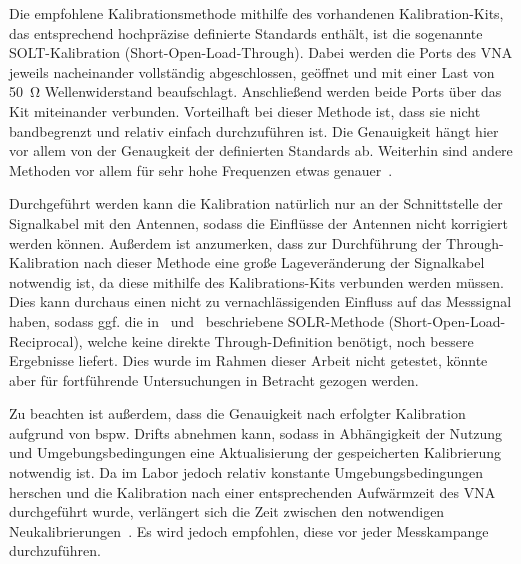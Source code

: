 Die empfohlene Kalibrationsmethode mithilfe des vorhandenen Kalibration-Kits, das entsprechend hochpräzise definierte Standards enthält, ist die sogenannte SOLT-Kalibration (Short-Open-Load-Through). Dabei werden die Ports des VNA jeweils nacheinander vollständig abgeschlossen, geöffnet und mit einer Last von \SI{50}{\ohm} Wellenwiderstand beaufschlagt. Anschließend werden beide Ports über das Kit miteinander verbunden. Vorteilhaft bei dieser Methode ist, dass sie nicht bandbegrenzt und relativ einfach durchzuführen ist. Die Genauigkeit hängt hier vor allem von der Genaugkeit der definierten Standards ab. Weiterhin sind andere Methoden vor allem für sehr hohe Frequenzen etwas genauer~\cite{VNA-Calibration_Application_Note}. 
\par
\vspace{\linespace}
Durchgeführt werden kann die Kalibration natürlich nur an der Schnittstelle der Signalkabel mit den Antennen, sodass die Einflüsse der Antennen nicht korrigiert werden können. Außerdem ist anzumerken, dass zur Durchführung der \glqq Through\grqq-Kalibration nach dieser Methode eine große Lageveränderung der Signalkabel notwendig ist, da diese mithilfe des Kalibrations-Kits verbunden werden müssen. Dies kann durchaus einen nicht zu vernachlässigenden Einfluss auf das Messsignal haben, sodass ggf. die in~\cite{VNA-Calibration_Application_Note} und~\cite{VNA-Handbuch} beschriebene SOLR-Methode (Short-Open-Load-Reciprocal), welche keine direkte \glqq Through\grqq-Definition benötigt, noch bessere Ergebnisse liefert. Dies wurde im Rahmen dieser Arbeit nicht getestet, könnte aber für fortführende Untersuchungen in Betracht gezogen werden.
\par
\vspace{\linespace}
Zu beachten ist außerdem, dass die Genauigkeit nach erfolgter Kalibration aufgrund von bspw. Drifts abnehmen kann, sodass in Abhängigkeit der Nutzung und Umgebungsbedingungen eine Aktualisierung der gespeicherten Kalibrierung notwendig ist. Da im Labor jedoch relativ konstante Umgebungsbedingungen herschen und die Kalibration nach einer entsprechenden Aufwärmzeit des VNA durchgeführt wurde, verlängert sich die Zeit zwischen den notwendigen Neukalibrierungen~\cite{VNA-Handbuch, VNA_Error_Models_and_Calibration_Methods}. Es wird jedoch empfohlen, diese vor jeder Messkampange durchzuführen.









